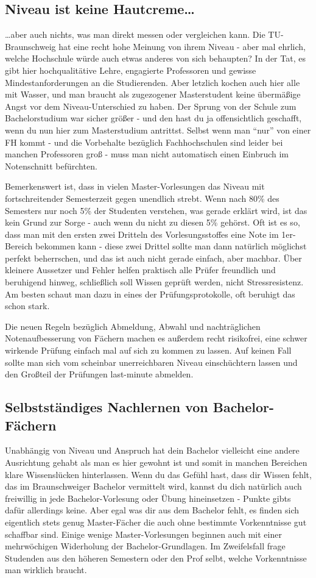 \begin{multicols}{2}
\subsection{Niveau ist keine Hautcreme\ldots}
\ldots aber auch nichts, was man direkt messen oder vergleichen kann. Die TU-Braunschweig hat eine recht hohe Meinung von ihrem Niveau - aber mal ehrlich, welche Hochschule würde auch etwas anderes von sich behaupten? In der Tat, es gibt hier hochqualitätive Lehre, engagierte Professoren und gewisse Mindestanforderungen an die Studierenden. Aber letzlich kochen auch hier alle mit Wasser, und man braucht als zugezogener Masterstudent keine übermäßige Angst vor dem Niveau-Unterschied zu haben. Der Sprung von der Schule zum Bachelorstudium war sicher größer - und den hast du ja offensichtlich geschafft, wenn du nun hier zum Masterstudium antrittst. Selbst wenn man "`nur"' von einer FH kommt - und die Vorbehalte bezüglich Fachhochschulen sind leider bei manchen Professoren groß - muss man nicht automatisch einen Einbruch im Notenschnitt befürchten.

Bemerkenswert ist, dass in vielen Master-Vorlesungen das Niveau mit fortschreitender Semesterzeit gegen unendlich strebt. Wenn nach 80\% des Semesters nur noch 5\% der Studenten verstehen, was gerade erklärt wird, ist das kein Grund zur Sorge - auch wenn du nicht zu diesen 5\% gehörst. Oft ist es so, dass man mit den ersten zwei Dritteln des Vorlesungsstoffes eine Note im 1er-Bereich bekommen kann - diese zwei Drittel sollte man dann natürlich möglichst perfekt beherrschen, und das ist auch nicht gerade einfach, aber machbar. Über kleinere Aussetzer und Fehler helfen praktisch alle Prüfer freundlich und beruhigend hinweg, schließlich soll Wissen geprüft werden, nicht Stressresistenz. Am besten schaut man dazu in eines der Prüfungsprotokolle, oft beruhigt das schon stark.

Die neuen Regeln bezüglich Abmeldung, Abwahl und nachträglichen
Notenaufbesserung von Fächern machen es außerdem recht risikofrei, eine
schwer wirkende Prüfung einfach mal auf sich zu kommen zu lassen. Auf
keinen Fall sollte man sich vom scheinbar unerreichbaren Niveau
einschüchtern lassen und den Großteil der Prüfungen last-minute
abmelden.
\subsection{Selbstständiges Nachlernen von Bachelor-Fächern}
Unabhängig von Niveau und Anspruch hat dein Bachelor vielleicht eine andere Ausrichtung gehabt als man es hier gewohnt ist und somit in manchen Bereichen klare Wissenslücken hinterlassen. Wenn du das Gefühl hast, dass dir Wissen fehlt, das im Braunschweiger Bachelor vermittelt wird, kannst du dich natürlich auch freiwillig in jede Bachelor-Vorlesung oder Übung hineinsetzen - Punkte gibts dafür allerdings keine. Aber egal was dir aus dem Bachelor fehlt, es finden sich eigentlich stets genug Master-Fächer die auch ohne bestimmte Vorkenntnisse gut schaffbar sind. Einige wenige Master-Vorlesungen beginnen auch mit einer mehrwöchigen Widerholung der Bachelor-Grundlagen. Im Zweifelsfall frage Studenden aus den höheren Semestern oder den Prof selbt, welche Vorkenntnisse man wirklich braucht.
\label{masterstundenplan}

\end{multicols}
